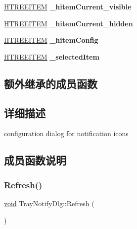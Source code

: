 \begin{DoxyCompactItemize}
\item 
\mbox{\label{struct_tray_notify_dlg_a363c21b41cddd66d03b31c10f27b7ae0}} 
\hyperlink{struct___t_r_e_e_i_t_e_m}{H\+T\+R\+E\+E\+I\+T\+EM} {\bfseries \+\_\+hitem\+Current\+\_\+visible}
\item 
\mbox{\label{struct_tray_notify_dlg_a24996df7c9f17354683366a6eac7375e}} 
\hyperlink{struct___t_r_e_e_i_t_e_m}{H\+T\+R\+E\+E\+I\+T\+EM} {\bfseries \+\_\+hitem\+Current\+\_\+hidden}
\item 
\mbox{\label{struct_tray_notify_dlg_a4c4849a0e8cb8229fb3163b2903f3eb0}} 
\hyperlink{struct___t_r_e_e_i_t_e_m}{H\+T\+R\+E\+E\+I\+T\+EM} {\bfseries \+\_\+hitem\+Config}
\item 
\mbox{\label{struct_tray_notify_dlg_a30c9555a7e7c73155b6f3cb6f2b88f67}} 
\hyperlink{struct___t_r_e_e_i_t_e_m}{H\+T\+R\+E\+E\+I\+T\+EM} {\bfseries \+\_\+selected\+Item}
\end{DoxyCompactItemize}
\subsection*{额外继承的成员函数}


\subsection{详细描述}
configuration dialog for notification icons 

\subsection{成员函数说明}
\mbox{\label{struct_tray_notify_dlg_a8e27d7865edb16d7bbecff7534116899}} 
\subsubsection{\texorpdfstring{Refresh()}{Refresh()}}
{\footnotesize\ttfamily \hyperlink{interfacevoid}{void} Tray\+Notify\+Dlg\+::\+Refresh (\begin{DoxyParamCaption}{ }\end{DoxyParamCaption})\hspace{0.3cm}{\ttfamily [protected]}}

